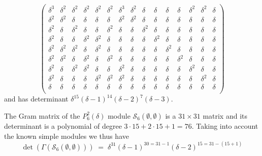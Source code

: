 \documentclass[reqno,10pt,a4paper]{amsart}
\newcommand{\cell}{\mathcal{S}}
\newcommand{\Gram}{\Gamma}
\begin{document}
\begin{eg}
{{\[\begin{pmatrix}
\delta^3 & \delta^2 & \delta^2 & \delta^2 & \delta^2 & \delta^2 & \delta^3 & \delta^2 & \delta & \delta & \delta & \delta & \delta^2 & \delta^2 & \delta \\
\delta^2 & \delta^2 & \delta & \delta & \delta & \delta & \delta^2 & \delta^2 & \delta & \delta & \delta & \delta & \delta & \delta & \delta \\
\delta^2 & \delta & \delta^2 & \delta & \delta & \delta^2 & \delta & \delta & \delta^2 & \delta & \delta & \delta & \delta & \delta & \delta \\
\delta^2 & \delta & \delta & \delta^2 & \delta^2 & \delta & \delta & \delta & \delta & \delta^2 & \delta & \delta & \delta & \delta & \delta \\
\delta^2 & \delta^2 & \delta^2 & \delta & \delta^2 & \delta & \delta & \delta & \delta & \delta & \delta^2 & \delta & \delta & \delta & \delta \\
\delta^2 & \delta^2 & \delta & \delta^2 & \delta & \delta^2 & \delta & \delta & \delta & \delta & \delta & \delta^2 & \delta & \delta & \delta \\
\delta^2 & \delta & \delta^2 & \delta^2 & \delta & \delta & \delta^2 & \delta & \delta & \delta & \delta & \delta & \delta^2 & \delta & \delta \\
\delta^2 & \delta & \delta & \delta & \delta^2 & \delta^2 & \delta^2 & \delta & \delta & \delta & \delta & \delta & \delta & \delta^2 & \delta \\
\delta & \delta & \delta & \delta & \delta & \delta & \delta & \delta & \delta & \delta & \delta & \delta & \delta & \delta & \delta \\
\end{pmatrix}
\] and has determinant $\delta^{15}(\delta-1)^{{14}}(\delta-2)^7(\delta-3)$.
}}  %

The Gram matrix of the $P^2_6(\delta)$ module $\cell_6(\emptyset,\emptyset)$ is a $31\times 31$ matrix and its determinant is a polynomial of degree $3\cdot15+2\cdot15+1=76$. 
Taking into account the known simple modules 
we thus have
{
$$
\det(
\Gram 
(\cell_6(\emptyset,\emptyset))) \; = \; \delta^{31}(\delta-1)^{30=31-1}(\delta-2)^{15=31-(15+1)}
$$
}

\end{eg}
\end{document}
